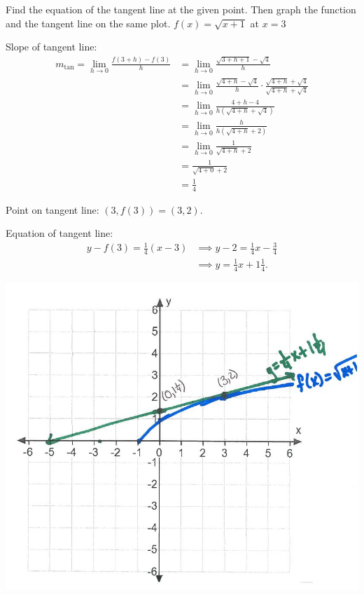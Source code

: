 \documentclass[nooutcomes,handout]{ximera}
\begin{document}
\begin{problem} Find the equation of the tangent line at the given point.  Then graph the function and the tangent line on the same plot.
$f(x)=\sqrt{x+1}$ at $x=3$

	\begin{freeResponse}
	Slope of tangent line:
	\begin{align*}	
	m_{\mathrm{tan}} = \lim_{h \to 0} \frac{f(3+h) - f(3)}{h}&=\lim_{h \to 0}\frac{\sqrt{3+h+1} - \sqrt{4}}{h}\\
	&=\lim_{h \to 0}\frac{\sqrt{4+h} - \sqrt{4}}{h} \cdot \frac{\sqrt{4+h} + \sqrt{4}}{\sqrt{4+h} + \sqrt{4}}\\
	&=\lim_{h \to 0}\frac{4+h-4}{h(\sqrt{4+h} + \sqrt{4})}\\
	&=\lim_{h \to 0}\frac{h}{h(\sqrt{4+h} + 2)}\\
	&=\lim_{h \to 0}\frac{1}{\sqrt{4+h} + 2}\\
	&=\frac{1}{\sqrt{4+0} + 2}\\
	&=\frac{1}{4}
	\end{align*}

        Point on tangent line: $(3, f(3)) = (3, 2)$.

        Equation of tangent line:
        \begin{align*}
          y - f(3) =  \frac{1}{4}(x-3) &\implies y - 2 = \frac{1}{4}x - \frac{3}{4}\\
          &\implies y = \frac{1}{4}x + 1\frac{1}{4}.
        \end{align*}
	        \begin{image}
          \includegraphics[scale = 0.5]{Figure5.JPG}
        \end{image}

	\end{freeResponse}

\end{problem}
\end{document}
